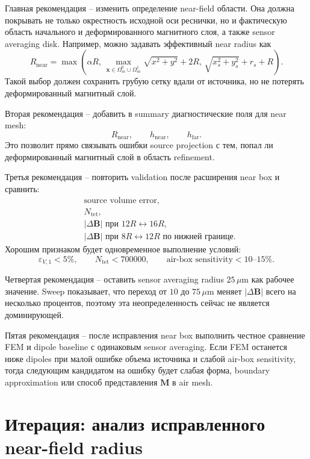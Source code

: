 \documentclass[12pt,a4paper]{article}
\begin{document}
Главная рекомендация -- изменить определение near-field области. Она должна
покрывать не только окрестность исходной оси реснички, но и фактическую область
начального и деформированного магнитного слоя, а также sensor averaging disk.
Например, можно задавать эффективный near radius как
\[
    R_{\mathrm{near}}
    =
    \max\left(
    \alpha R,\,
    \max_{\mathbf x\in\Omega_m^0\cup\Omega_m^1}
    \sqrt{x^2+y^2}
    + 2R,\,
    \sqrt{x_s^2+y_s^2}+r_s+R
    \right).
\]
Такой выбор должен сохранить грубую сетку вдали от источника, но не потерять
деформированный магнитный слой.

Вторая рекомендация -- добавить в summary диагностические поля для near mesh:
\[
    R_{\mathrm{near}},\qquad
    h_{\mathrm{near}},\qquad
    h_{\mathrm{far}}.
\]
Это позволит прямо связывать ошибки source projection с тем, попал ли
деформированный магнитный слой в область refinement.

Третья рекомендация -- повторить validation после расширения near box и
сравнить:
\[
\begin{aligned}
&\text{source volume error},\\
&N_{\mathrm{tet}},\\
&|\Delta\mathbf B| \text{ при } 12R\leftrightarrow 16R,\\
&|\Delta\mathbf B| \text{ при } 8R\leftrightarrow 12R \text{ по нижней границе}.
\end{aligned}
\]
Хорошим признаком будет одновременное выполнение условий:
\[
    \varepsilon_{V,1}<5\%,\qquad
    N_{\mathrm{tet}}<700000,\qquad
    \text{air-box sensitivity}<10\text{--}15\%.
\]

Четвертая рекомендация -- оставить sensor averaging radius \(25\,\mu\mathrm{m}\)
как рабочее значение. Sweep показывает, что переход от \(10\) до \(75\,\mu
\mathrm{m}\) меняет \(|\Delta\mathbf B|\) всего на несколько процентов, поэтому
эта неопределенность сейчас не является доминирующей.

Пятая рекомендация -- после исправления near box выполнить честное сравнение
FEM и dipole baseline с одинаковым sensor averaging. Если FEM останется ниже
dipoles при малой ошибке объема источника и слабой air-box sensitivity, тогда
следующим кандидатом на ошибку будет слабая форма, boundary approximation или
способ представления \(\mathbf M\) в air mesh.

\section{Итерация: анализ исправленного near-field radius}
\end{document}
